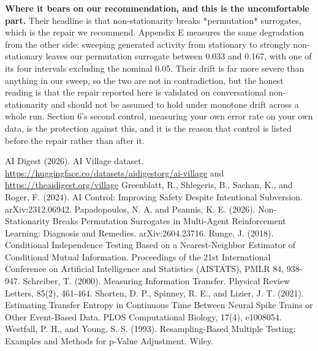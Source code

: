 \documentclass[11pt]{article}
\begin{document}
\textbf{Where it bears on our recommendation, and this is the uncomfortable part.} Their headline is that non-stationarity breaks *permutation* surrogates, which is the repair we recommend. Appendix E measures the same degradation from the other side: sweeping generated activity from stationary to strongly non-stationary leaves our permutation surrogate between 0.033 and 0.167, with one of its four intervals excluding the nominal 0.05. Their drift is far more severe than anything in our sweep, so the two are not in contradiction, but the honest reading is that the repair reported here is validated on conversational non-stationarity and should not be assumed to hold under monotone drift across a whole run. Section 6's second control, measuring your own error rate on your own data, is the protection against this, and it is the reason that control is listed before the repair rather than after it.

\begin{thebibliography}{}
AI Digest (2026). AI Village dataset. \url{https://huggingface.co/datasets/aidigestorg/ai-village} and \url{https://theaidigest.org/village}
Greenblatt, R., Shlegeris, B., Sachan, K., and Roger, F. (2024). AI Control: Improving Safety Despite Intentional Subversion. arXiv:2312.06942.
Papadopoulos, N. A. and Psannis, K. E. (2026). Non-Stationarity Breaks Permutation Surrogates in Multi-Agent Reinforcement Learning: Diagnosis and Remedies. arXiv:2604.23716.
Runge, J. (2018). Conditional Independence Testing Based on a Nearest-Neighbor Estimator of Conditional Mutual Information. Proceedings of the 21st International Conference on Artificial Intelligence and Statistics (AISTATS), PMLR 84, 938-947.
Schreiber, T. (2000). Measuring Information Transfer. Physical Review Letters, 85(2), 461-464.
Shorten, D. P., Spinney, R. E., and Lizier, J. T. (2021). Estimating Transfer Entropy in Continuous Time Between Neural Spike Trains or Other Event-Based Data. PLOS Computational Biology, 17(4), e1008054.
Westfall, P. H., and Young, S. S. (1993). Resampling-Based Multiple Testing: Examples and Methods for p-Value Adjustment. Wiley.
\end{thebibliography}
\end{document}
